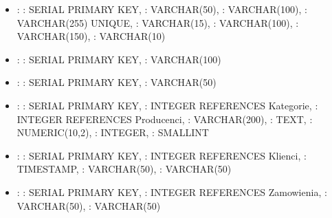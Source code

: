 \documentclass[letterpaper,10pt,polish]{sphinxmanual}
\begin{document}
\sphinxAtStartPar
{}
\begin{itemize}
\item {} 
\sphinxAtStartPar
{}:  : SERIAL PRIMARY KEY,  : VARCHAR(50),  : VARCHAR(100),  : VARCHAR(255) UNIQUE,  : VARCHAR(15),  : VARCHAR(100),  : VARCHAR(150),  : VARCHAR(10)

\item {} 
\sphinxAtStartPar
{}:  : SERIAL PRIMARY KEY,  : VARCHAR(100)

\item {} 
\sphinxAtStartPar
{}:  : SERIAL PRIMARY KEY,  : VARCHAR(50)

\item {} 
\sphinxAtStartPar
{}:  : SERIAL PRIMARY KEY,  : INTEGER REFERENCES Kategorie,  : INTEGER REFERENCES Producenci,  : VARCHAR(200),  : TEXT,  : NUMERIC(10,2),  : INTEGER,  : SMALLINT

\item {} 
\sphinxAtStartPar
{}:  : SERIAL PRIMARY KEY,  : INTEGER REFERENCES Klienci,  : TIMESTAMP,  : VARCHAR(50),  : VARCHAR(50)

\item {} 
\sphinxAtStartPar
{}:  : SERIAL PRIMARY KEY,  : INTEGER REFERENCES Zamowienia,  : VARCHAR(50),  : VARCHAR(50)


\end{itemize}
\end{document}
